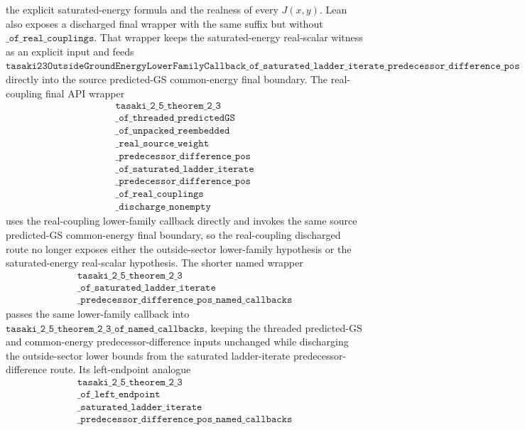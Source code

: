 \documentclass[a4paper,11pt]{article}
\begin{document}
the explicit saturated-energy formula and the realness of every \(J(x,y)\).
Lean also exposes a discharged final wrapper with the same suffix but without
\(\texttt{\_of\_real\_couplings}\).  That wrapper keeps the saturated-energy
real-scalar witness as an explicit input and feeds
\(\texttt{tasaki23OutsideGroundEnergyLowerFamilyCallback\_of\_saturated\_ladder\_iterate\_predecessor\_difference\_pos}\)
directly into the source predicted-GS common-energy final boundary.  The
real-coupling final API
wrapper
\[
\begin{gathered}
\texttt{tasaki\_2\_5\_theorem\_2\_3}\\
\texttt{\_of\_threaded\_predictedGS}\\
\texttt{\_of\_unpacked\_reembedded}\\
\texttt{\_real\_source\_weight}\\
\texttt{\_predecessor\_difference\_pos}\\
\texttt{\_of\_saturated\_ladder\_iterate}\\
\texttt{\_predecessor\_difference\_pos}\\
\texttt{\_of\_real\_couplings}\\
\texttt{\_discharge\_nonempty}
\end{gathered}
\]
uses the real-coupling lower-family callback directly and invokes the same
source predicted-GS common-energy final boundary, so the real-coupling
discharged route no longer exposes either the outside-sector lower-family
hypothesis or the saturated-energy real-scalar hypothesis.  The
shorter named wrapper
\[
\begin{gathered}
\texttt{tasaki\_2\_5\_theorem\_2\_3}\\
\texttt{\_of\_saturated\_ladder\_iterate}\\
\texttt{\_predecessor\_difference\_pos\_named\_callbacks}
\end{gathered}
\]
passes the same lower-family callback into
\(\texttt{tasaki\_2\_5\_theorem\_2\_3\_of\_named\_callbacks}\), keeping the
threaded predicted-GS and common-energy predecessor-difference inputs unchanged
while discharging the outside-sector lower bounds from the saturated
ladder-iterate predecessor-difference route.  Its left-endpoint analogue
\[
\begin{gathered}
\texttt{tasaki\_2\_5\_theorem\_2\_3}\\
\texttt{\_of\_left\_endpoint}\\
\texttt{\_saturated\_ladder\_iterate}\\
\texttt{\_predecessor\_difference\_pos\_named\_callbacks}
\end{gathered}
\]
\end{document}

